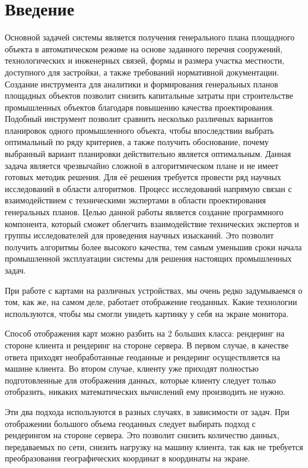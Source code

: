 \section*{\Large{Введение}}
Основной задачей системы является получения генерального плана площадного объекта в
автоматическом режиме на основе заданного перечня сооружений, технологических и
инженерных связей, формы и размера участка местности, доступного для застройки, а также
требований нормативной документации.
Создание инструмента для аналитики и формирования генеральных планов площадных объектов
позволит снизить капитальные затраты при строительстве промышленных объектов благодаря
повышению качества проектирования. Подобный инструмент позволит сравнить несколько
различных вариантов планировок одного промышленного объекта, чтобы впоследствии выбрать
оптимальный по ряду критериев, а также получить обоснование, почему выбранный вариант
планировки действительно является оптимальным.
Данная задача является чрезвычайно сложной в алгоритмическом плане и не имеет готовых
методик решения. Для её решения требуется провести ряд научных исследований в области
алгоритмов. Процесс исследований напрямую связан с взаимодействием с техническими
экспертами в области проектирования генеральных планов.
Целью данной работы является создание программного компонента, который сможет облегчить
взаимодействие технических экспертов и группы исследователей для проведения научных
изысканий. Это позволит получить алгоритмы более высокого качества, тем самым уменьшив
сроки начала промышленной эксплуатации системы для решения настоящих промышленных
задач.





При работе с картами на различных устройствах, мы очень редко задумываемся о том, как же, на самом деле,
работает отображение геоданных. Какие технологии используются, чтобы мы смогли увидеть картинку у себя на экране
монитора.

Способ отображения карт можно разбить на 2 больших класса: рендеринг на стороне клиента и рендеринг на стороне
сервера.
В первом случае, в качестве ответа приходят необработанные геоданные и рендеринг осуществляется на машине клиента.
Во втором случае, клиенту уже приходят полностью подготовленные для отображения данных,
которые клиенту следует только отобразить,
никаких математических вычислений ему производить не нужно.

Эти два подхода используются в разных случаях, в зависимости от задач.
При отображении большого объема геоданных следует выбирать подход с рендерингом
на стороне сервера. Это позволит снизить количество данных, передаваемых по сети, снизить нагрузку на
машину клиента, так как не требуется преобразования географических координат в координаты на экране.

